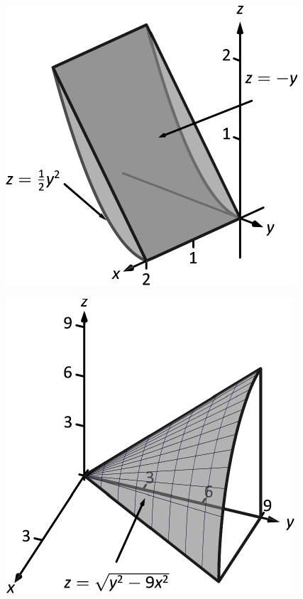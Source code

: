 \documentclass[10pt]{article}
\begin{document}
\includegraphics{fig13_06_ex_09_3DBW.pdf}
\texttt{}

\includegraphics{fig13_06_ex_10_3DBW.pdf}
\texttt{}
\end{document}
